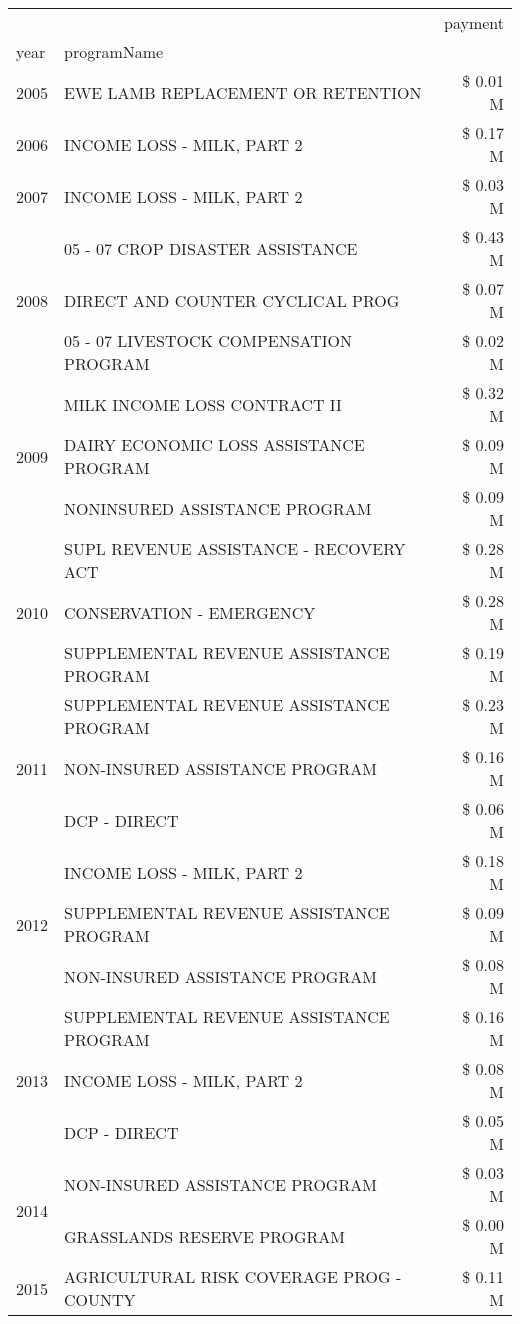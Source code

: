 \begin{tabular}{llr}
\toprule
 &  & payment \\
year & programName &  \\
\midrule
2005 & EWE LAMB REPLACEMENT OR RETENTION & \$ 0.01 M \\
\cline{1-3}
2006 & INCOME LOSS - MILK, PART 2 & \$ 0.17 M \\
\cline{1-3}
2007 & INCOME LOSS - MILK, PART 2 & \$ 0.03 M \\
\cline{1-3}
\multirow[t]{3}{*}{2008} & 05 - 07 CROP DISASTER ASSISTANCE & \$ 0.43 M \\
 & DIRECT AND COUNTER CYCLICAL PROG & \$ 0.07 M \\
 & 05 - 07 LIVESTOCK COMPENSATION PROGRAM & \$ 0.02 M \\
\cline{1-3}
\multirow[t]{3}{*}{2009} & MILK INCOME LOSS CONTRACT II & \$ 0.32 M \\
 & DAIRY ECONOMIC LOSS ASSISTANCE PROGRAM & \$ 0.09 M \\
 & NONINSURED ASSISTANCE PROGRAM & \$ 0.09 M \\
\cline{1-3}
\multirow[t]{3}{*}{2010} & SUPL REVENUE ASSISTANCE - RECOVERY ACT & \$ 0.28 M \\
 & CONSERVATION - EMERGENCY & \$ 0.28 M \\
 & SUPPLEMENTAL REVENUE ASSISTANCE PROGRAM & \$ 0.19 M \\
\cline{1-3}
\multirow[t]{3}{*}{2011} & SUPPLEMENTAL REVENUE ASSISTANCE PROGRAM & \$ 0.23 M \\
 & NON-INSURED ASSISTANCE PROGRAM & \$ 0.16 M \\
 & DCP - DIRECT & \$ 0.06 M \\
\cline{1-3}
\multirow[t]{3}{*}{2012} & INCOME LOSS - MILK, PART 2 & \$ 0.18 M \\
 & SUPPLEMENTAL REVENUE ASSISTANCE PROGRAM & \$ 0.09 M \\
 & NON-INSURED ASSISTANCE PROGRAM & \$ 0.08 M \\
\cline{1-3}
\multirow[t]{3}{*}{2013} & SUPPLEMENTAL REVENUE ASSISTANCE PROGRAM & \$ 0.16 M \\
 & INCOME LOSS - MILK, PART 2 & \$ 0.08 M \\
 & DCP - DIRECT & \$ 0.05 M \\
\cline{1-3}
\multirow[t]{2}{*}{2014} & NON-INSURED ASSISTANCE PROGRAM & \$ 0.03 M \\
 & GRASSLANDS RESERVE PROGRAM & \$ 0.00 M \\
\cline{1-3}
\multirow[t]{3}{*}{2015} & AGRICULTURAL RISK COVERAGE PROG - COUNTY & \$ 0.11 M \\

\end{tabular}
